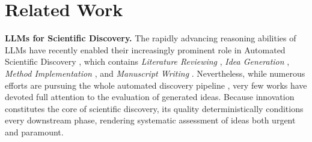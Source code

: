 \vspace{-0.2cm}
\section{Related Work}

\textbf{LLMs for Scientific Discovery.}
The rapidly advancing reasoning abilities of LLMs \cite{reasoning-survey,long-cot-survey} have recently enabled their increasingly prominent role in Automated Scientific Discovery \cite{dsgym,agent-laboratory,ai-scientist,how-far-ai-sci,datamind}, which contains \textit{Literature Reviewing} \cite{autosurvey,surveyx,opensholar,surveyforge,litllms}, \textit{Idea Generation} \cite{chain-of-ideas,virsci,deep-ideation,researchagent,scipip}, \textit{Method Implementation} \cite{alphaevolve,automind,ml-master,alpharesearch,aide}, and \textit{Manuscript Writing} \cite{overleafcoplilot,xtragpt}.
Nevertheless, while numerous efforts are pursuing the whole automated discovery pipeline \cite{ai-scientist,agent-laboratory,deepscientist,ai-scientist-v2,omniscientist,internagent}, very few works have devoted full attention to the evaluation of generated ideas.
Because innovation constitutes the core of scientific discovery, its quality deterministically conditions every downstream phase, rendering systematic assessment of ideas both urgent and paramount.

